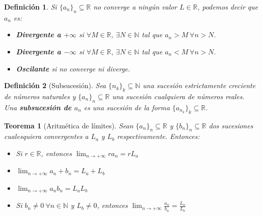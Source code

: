 \documentclass{article}
\newtheorem{theorem}{Teorema}
\newtheorem{define}{Definición}
\begin{document}
\begin{define}
	Si $\{ a_n\}_n \subseteq \mathbb{R}$ no converge a ningún valor $L\in\mathbb{R}$, podemos decir que $a_n$ es:
	\begin{itemize}
		\item
		\textbf{Divergente a $+\infty$} si $\forall M \in \mathbb{R},\ \exists N \in \mathbb{N}$ tal que $a_n > M\ \forall n>N$.
		
		\item
		\textbf{Divergente a $-\infty$} si $\forall M \in \mathbb{R},\ \exists N \in \mathbb{N}$ tal que $a_n < M\ \forall n>N$.
		
		\item
		\textbf{Oscilante} si no converge ni diverge.
	\end{itemize}
\end{define}


\begin{define}[Subsucesión]
	Sea $\{ n_k\}_k \subseteq \mathbb{N}$ una sucesión estrictamente creciente de números naturales y $\{ a_n\}_n \subseteq \mathbb{R}$ una sucesión cualquiera de números reales.
	Una \textbf{subsucesión de $a_n$} es una sucesión de la forma $\{ a_{n_k}\}_k \subseteq \mathbb{R}$.
\end{define}

\begin{theorem}[Aritmética de límites]
	Sean $\{ a_n\}_n \subseteq \mathbb{R}$ y $\{ b_n\}_n \subseteq \mathbb{R}$ dos sucesiones cualesquiera convergentes a $L_a$ y $L_b$ respectivamente. Entonces:
	\begin{itemize}
		\item
		Si $r \in \mathbb{R}$, entonces $\lim_{n\rightarrow +\infty} ra_n = rL_a$
		\item
		$\lim_{n\rightarrow +\infty} a_n + b_n = L_a + L_b$
		\item
		$\lim_{n\rightarrow +\infty} a_nb_n = L_aL_b$
		\item
		Si $b_n \neq 0\ \forall n \in \mathbb{N}$ y $L_b \not= 0$, entonces $\lim_{n\rightarrow +\infty} \frac{a_n}{b_n} = \frac{L_a}{L_b}$
	\end{itemize}
\end{theorem}
\end{document}
